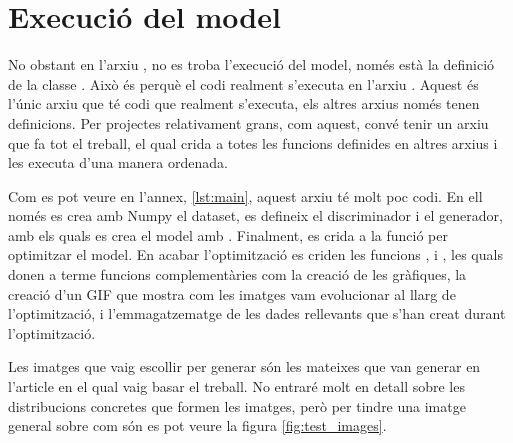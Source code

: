 \section{Execució del model}

No obstant en l'arxiu , no es troba l'execució del model, només està la definició de la classe . Això és perquè el codi realment s'executa en l'arxiu . Aquest és l'únic arxiu que té codi que realment s'executa, els altres arxius només tenen definicions. Per projectes relativament grans, com aquest, convé tenir un arxiu que fa tot el treball, el qual crida a totes les funcions definides en altres arxius i les executa d'una manera ordenada. 

Com es pot veure en l'annex, \ref{lst:main}, aquest arxiu té molt poc codi. En ell només es crea amb Numpy el dataset, es defineix el discriminador i el generador, amb els quals es crea el model amb . Finalment, es crida a la funció  per optimitzar el model. En acabar l'optimització es criden les funcions ,  i , les quals donen a terme funcions complementàries com la creació de les gràfiques, la creació d'un GIF que mostra com les imatges vam evolucionar al llarg de l'optimització, i l'emmagatzematge de les dades rellevants que s'han creat durant l'optimització.

Les imatges que vaig escollir per generar són les mateixes que van generar en l'article en el qual vaig basar el treball. No entraré molt en detall sobre les distribucions concretes que formen les imatges, però per tindre una imatge general sobre com són es pot veure la figura \ref{fig:test_images}.

